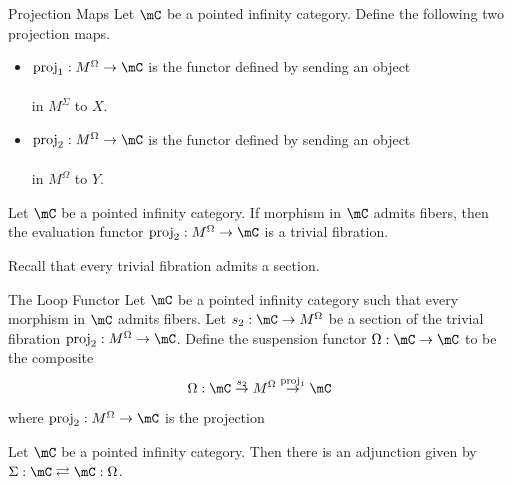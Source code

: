 \documentclass[a4paper]{article}
\begin{document}
\begin{defn}{Projection Maps}{} Let $\mC$ be a pointed infinity category. Define the following two projection maps. 
\begin{itemize}
\item $\text{proj}_1:M^\Omega\to\mC$ is the functor defined by sending an object \\
\\
in $M^\Sigma$ to $X$. 
\item $\text{proj}_2:M^\Omega\to\mC$ is the functor defined by sending an object \\
\\
in $M^\Omega$ to $Y$. 
\end{itemize}
\end{defn}

\begin{lmm}{}{} Let $\mC$ be a pointed infinity category. If morphism in $\mC$ admits fibers, then the evaluation functor $\text{proj}_2:M^\Omega\to\mC$ is a trivial fibration. 
\end{lmm}

Recall that every trivial fibration admits a section. 

\begin{defn}{The Loop Functor}{} Let $\mC$ be a pointed infinity category such that every morphism in $\mC$ admits fibers. Let $s_2:\mC\to M^\Omega$ be a section of the trivial fibration $\text{proj}_2:M^\Omega\to\mC$. Define the suspension functor $\Omega:\mC\to\mC$ to be the composite $$\Omega:\mC\overset{s_2}{\rightarrow}M^\Omega\overset{\text{proj}_1}{\rightarrow}\mC$$ where $\text{proj}_2:M^\Omega\to\mC$ is the projection 
\end{defn}

\begin{prp}{}{} Let $\mC$ be a pointed infinity category. Then there is an adjunction given by $\Sigma:\mC\rightleftarrows\mC:\Omega$. 
\end{prp}
\end{document}
